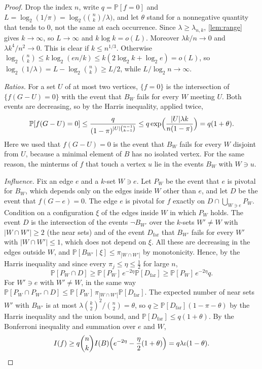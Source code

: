 \documentclass[11pt]{amsart}
\theoremstyle{remark}
\renewcommand{\Pr}{\mathbb{P}}
\begin{document}
\begin{proof}
Drop the index $n$, write $q=\Pr[f=0]$ and $L=\log_2(1/\pi)=\log_2\bigl(\binom nk/\lambda\bigr)$, and let $\theta$
stand for a nonnegative quantity that tends to $0$, not the same at each occurrence. Since $\lambda\ge\lambda_{n,k}$,
\cref{lem:range} gives $k\to\infty$, so $L\to\infty$ and $k\log k=o(L)$. Moreover $\lambda k/n\to0$ and
$\lambda k^4/n^2\to0$. This is clear if $k\le n^{1/3}$. Otherwise $\log_2\binom nk\le k\log_2(en/k)\le
k(2\log_2k+\log_2e)=o(L)$, so $\log_2(1/\lambda)=L-\log_2\binom nk\ge L/2$, while $L/\log_2n\to\infty$.

\emph{Ratios.} For a set $U$ of at most two vertices, $\{f=0\}$ is the intersection of $\{f(G-U)=0\}$ with the event
that $B_W$ fails for every $W$ meeting $U$. Both events are decreasing, so by the Harris inequality, applied twice,
\begin{equation}\label{eq:ratio}
\Pr[f(G-U)=0]\le\frac q{(1-\pi)^{|U|\binom{n-1}{k-1}}}\le q\exp\Bigl(\frac{|U|\lambda k}{n(1-\pi)}\Bigr)=q(1+\theta).
\end{equation}
Here we used that $f(G-U)=0$ is the event that $B_W$ fails for every $W$ disjoint from $U$, because a minimal
element of $B$ has no isolated vertex. For the same reason, the minterms of $f$ that touch a vertex $u$ lie in the
events $B_W$ with $W\ni u$.

\emph{Influence.} Fix an edge $e$ and a $k$-set $W\ni e$. Let $P_W$ be the event that $e$ is pivotal for $B_W$,
which depends only on the edges inside $W$ other than $e$, and let $D$ be the event that $f(G-e)=0$. The edge $e$ is
pivotal for $f$ exactly on $D\cap\bigcup_{W\ni e}P_W$. Condition on a configuration $\xi$ of the edges inside $W$ in
which $P_W$ holds. The event $D$ is the intersection of the events $\neg B_{W'}$ over the $k$-sets $W'\ne W$ with
$|W\cap W'|\ge2$ (the near sets) and of the event $D_{\mathrm{far}}$ that $B_{W'}$ fails for every $W'$ with
$|W\cap W'|\le1$, which does not depend on $\xi$. All these are decreasing in the edges outside $W$, and
$\Pr[B_{W'}\mid\xi]\le\pi_{|W\cap W'|}$ by monotonicity. Hence, by the Harris inequality and since every
$\pi_j\le\eta\le\frac12$ for large $n$,
\[
\Pr[P_W\cap D]\ge\Pr[P_W]\,e^{-2\eta}\Pr[D_{\mathrm{far}}]\ge\Pr[P_W]\,e^{-2\eta}q .
\]
For $W'\ni e$ with $W'\ne W$, in the same way $\Pr[P_W\cap P_{W'}\cap D]\le\Pr[P_W]\,\pi_{|W\cap W'|}\Pr[D_{\mathrm{far}}]$.
The expected number of near sets $W'$ with $B_{W'}$ is at most $\lambda\binom k2^2/\binom n2=\theta$, so
$q\ge\Pr[D_{\mathrm{far}}](1-\pi-\theta)$ by the Harris inequality and the union bound, and
$\Pr[D_{\mathrm{far}}]\le q(1+\theta)$. By the Bonferroni inequality and summation over $e$ and $W$,
\begin{equation}\label{eq:inflocal}
I(f)\ge q\binom nkI(B)\Bigl(e^{-2\eta}-\frac\eta2(1+\theta)\Bigr)=q\lambda\iota(1-\theta).
\end{equation}


\end{proof}
\end{document}
